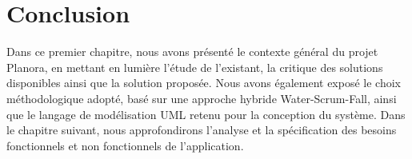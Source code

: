 \section*{Conclusion}
Dans ce premier chapitre, nous avons présenté le contexte général du projet Planora, en mettant en lumière l'étude de l'existant, la critique des solutions disponibles ainsi que la solution proposée. Nous avons également exposé le choix méthodologique adopté, basé sur une approche hybride Water-Scrum-Fall, ainsi que le langage de modélisation UML retenu pour la conception du système. Dans le chapitre suivant, nous approfondirons l'analyse et la spécification des besoins fonctionnels et non fonctionnels de l'application.
